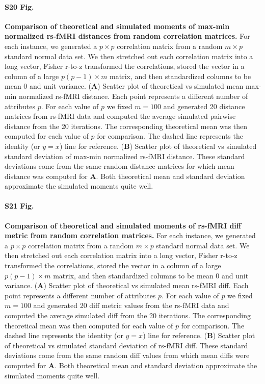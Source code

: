 \documentclass[10pt,letterpaper]{article}
\begin{document}
\paragraph*{S20 Fig.}
\hypertarget{S20_Fig}{
{\bf Comparison of theoretical and simulated moments of max-min normalized rs-fMRI distances from random correlation matrices.} For each instance, we generated a $p \times p$ correlation matrix from a random $m \times p$ standard normal data set. We then stretched out each correlation matrix into a long vector, Fisher r-to-z transformed the correlations, stored the vector in a column of a large $p(p-1) \times m$ matrix, and then standardized columns to be mean 0 and unit variance. (\textbf{A}) Scatter plot of theoretical vs simulated mean max-min normalized rs-fMRI distance. Each point represents a different number of attributes $p$. For each value of $p$ we fixed $m=100$ and generated 20 distance matrices from rs-fMRI data and computed the average simulated pairwise distance from the 20 iterations. The corresponding theoretical mean was then computed for each value of $p$ for comparison. The dashed line represents the identity (or $y=x$) line for reference. (\textbf{B}) Scatter plot of theoretical vs simulated standard deviation of max-min normalized rs-fMRI distance. These standard deviations come from the same random distance matrices for which mean distance was computed for \textbf{A}. Both theoretical mean and standard deviation approximate the simulated moments quite well.}

\paragraph*{S21 Fig.}
\hypertarget{S21_Fig}{
{\bf Comparison of theoretical and simulated moments of rs-fMRI diff metric from random correlation matrices.} For each instance, we generated a $p \times p$ correlation matrix from a random $m \times p$ standard normal data set. We then stretched out each correlation matrix into a long vector, Fisher r-to-z transformed the correlations, stored the vector in a column of a large $p(p-1) \times m$ matrix, and then standardized columns to be mean 0 and unit variance. (\textbf{A}) Scatter plot of theoretical vs simulated mean rs-fMRI diff. Each point represents a different number of attributes $p$. For each value of $p$ we fixed $m=100$ and generated 20 diff metric values from the rs-fMRI data and computed the average simulated diff from the 20 iterations. The corresponding theoretical mean was then computed for each value of $p$ for comparison. The dashed line represents the identity (or $y=x$) line for reference. (\textbf{B}) Scatter plot of theoretical vs simulated standard deviation of rs-fMRI diff. These standard deviations come from the same random diff values from which mean diffs were computed for \textbf{A}. Both theoretical mean and standard deviation approximate the simulated moments quite well.}
\end{document}
